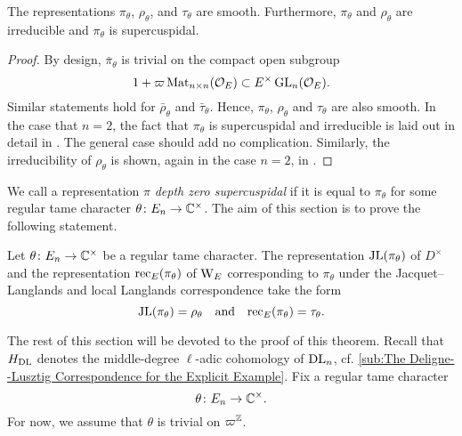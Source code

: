 \documentclass[../main.tex]{subfiles}
\begin{document}
\begin{lem}\label{lem:BarRepsAreSmooth}
  The representations $\pi_\theta$, $\rho_\theta$, and $\tau_\theta$ are smooth. 
  Furthermore, $\pi_\theta$ and $\rho_\theta$ are irreducible and $\pi_\theta$ is supercuspidal.
  \begin{proof}
    By design, $\bar \pi_\theta$ is trivial on the compact open subgroup 
    $$1 + \varpi \operatorname{Mat}_{n \times n}(\mathcal{O}_E) \subset E^\times \operatorname{GL}_n(\mathcal{O}_E).$$ Similar statements hold for $\bar \rho_\theta$ and $\bar \tau_\theta$. Hence,
    $\pi_\theta$, $\rho_\theta$ and $\tau_\theta$ are also smooth. 
    In the case that $n=2$, the fact that $\pi_\theta$ is supercuspidal and
    irreducible is laid out in detail in \cite[Section 11]{bushnell2006local}.
    The general case should add no complication. 
    Similarly, the irreducibility of $\rho_\theta$ is shown, again in the case 
    $n=2$, in \cite[Section 54]{bushnell2006local}. 
  \end{proof}
\end{lem}

We call a representation $\pi$ \emph{depth zero supercuspidal} if it is equal
to $\pi_\theta$ for some regular tame character $\theta \colon E_n \to \mathbb{C}^\times$. 
The aim of this section is to prove the following statement.
\begin{thm}\label{thm:MainRes1}
  Let $\theta\colon E_n \to \mathbb{C}^\times$ be a regular tame character.
  The representation $\mathrm{JL}(\pi_\theta)$ of $D^\times$ and the representation
  $\mathrm{rec}_E(\pi_\theta)$ of $\mathrm W_E$ corresponding to $\pi_\theta$ under the
  Jacquet--Langlands and local Langlands correspondence take the form
  \begin{equation*}
    \mathrm{JL}(\pi_\theta) = \rho_{\theta}
    \quad \text{and} \quad \mathrm{rec}_E(\pi_\theta) = \tau_\theta.
  \end{equation*}
\end{thm}

The rest of this section will be devoted to the proof of this theorem. 
Recall that $H_{\mathrm{DL}}$ denotes the middle-degree $\ell$-adic cohomology of 
$\mathrm{DL}_n$, cf. \cref{sub:The Deligne--Lusztig Correspondence for the
Explicit Example}. Fix a regular tame character
$$\theta\colon E_n \to \mathbb{C}^\times.$$ For now, we assume that $\theta$ is
trivial on $\varpi^{\mathbb{Z}}$. 
\end{document}
